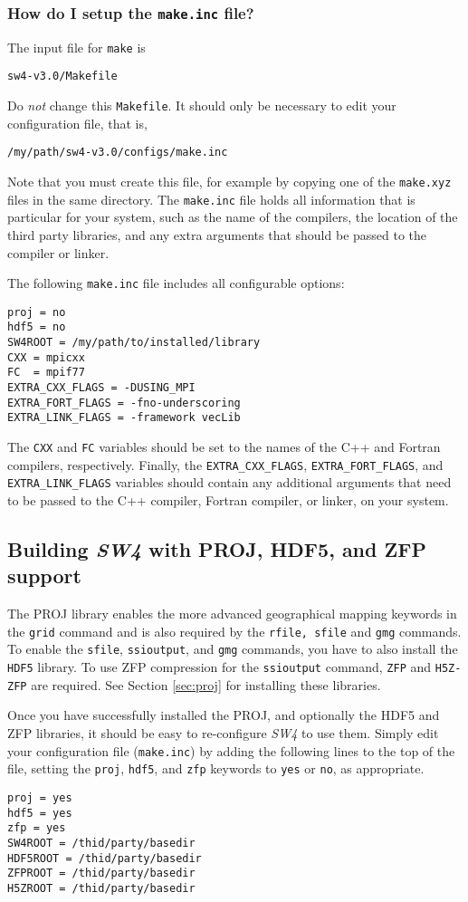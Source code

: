 \documentclass[11pt]{article}
\begin{document}
\subsubsection{How do I setup the {\tt make.inc} file?}

The input file for \verb+make+ is
\begin{verbatim}
sw4-v3.0/Makefile
\end{verbatim}
Do {\em not} change this \verb+Makefile+. It should only be necessary to edit your configuration
file, that is,
\begin{verbatim}
/my/path/sw4-v3.0/configs/make.inc
\end{verbatim}
Note that you must create this file, for example by copying one of the \verb+make.xyz+ files in the
same directory. The \verb+make.inc+ file holds all information that is particular for your system,
such as the name of the compilers, the location of the third party libraries, and any extra
arguments that should be passed to the compiler or linker. 

The following \verb+make.inc+ file includes all configurable options:
\begin{verbatim}
proj = no
hdf5 = no
SW4ROOT = /my/path/to/installed/library
CXX = mpicxx
FC  = mpif77
EXTRA_CXX_FLAGS = -DUSING_MPI
EXTRA_FORT_FLAGS = -fno-underscoring
EXTRA_LINK_FLAGS = -framework vecLib
\end{verbatim}
The \verb+CXX+ and \verb+FC+ variables should be set to the names of the C++ and
Fortran compilers, respectively. Finally, the \verb+EXTRA_CXX_FLAGS+, \verb+EXTRA_FORT_FLAGS+, and
\verb+EXTRA_LINK_FLAGS+ variables should contain any additional arguments that need to be passed to
the C++ compiler, Fortran compiler, or linker, on your system.

\subsection{Building \emph{SW4} with PROJ, HDF5, and ZFP support}
The PROJ library enables the more advanced geographical mapping keywords in the {\tt grid} command and is also required by the {\tt rfile, sfile} and {\tt gmg} commands. To enable the {\tt sfile}, {\tt ssioutput}, and {\tt gmg} commands, you have to also install the {\tt HDF5} library. To use ZFP compression for the {\tt ssioutput} command, {\tt ZFP} and {\tt H5Z-ZFP} are required. See Section \ref{sec:proj} for installing these libraries.

Once you have successfully installed the PROJ, and optionally the HDF5 and ZFP libraries, it should be easy to re-configure \emph{SW4} to use them. Simply edit your configuration file (\verb+make.inc+) by adding the following lines to the top of the file, setting the {\tt proj}, {\tt hdf5}, and {\tt zfp} keywords to
{\tt yes} or {\tt no}, as appropriate.
\begin{verbatim}
proj = yes 
hdf5 = yes
zfp = yes
SW4ROOT = /thid/party/basedir
HDF5ROOT = /thid/party/basedir
ZFPROOT = /thid/party/basedir
H5ZROOT = /thid/party/basedir
\end{verbatim}
\end{document}
